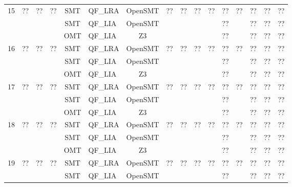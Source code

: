 \begin{landscape}
\begin{longtable}{|c|c|c|c|c|l|c|c|c|c|c|c|c|c|c|c|}
            \hline
            \multirow{3}{*}{15} & \multirow{3}{*}{??} & \multirow{3}{*}{??} & \multirow{3}{*}{??} & SMT & QF\_LRA & OpenSMT & \multirow{3}{*}{??} & \multirow{3}{*}{??} & \multirow{3}{*}{??} & \multirow{3}{*}{??} & ?? & \multirow{3}{*}{??} & ?? & ?? & ?? \\
            & & & & SMT & QF\_LIA & OpenSMT & & & & & ?? & & ?? & ?? & ?? \\
            & & & & OMT & QF\_LIA & Z3 & & & & & ?? & & ?? & ?? & ?? \\
            \hline
            \multirow{3}{*}{16} & \multirow{3}{*}{??} & \multirow{3}{*}{??} & \multirow{3}{*}{??} & SMT & QF\_LRA & OpenSMT & \multirow{3}{*}{??} & \multirow{3}{*}{??} & \multirow{3}{*}{??} & \multirow{3}{*}{??} & ?? & \multirow{3}{*}{??} & ?? & ?? & ?? \\
            & & & & SMT & QF\_LIA & OpenSMT & & & & & ?? & & ?? & ?? & ?? \\
            & & & & OMT & QF\_LIA & Z3 & & & & & ?? & & ?? & ?? & ?? \\
            \hline
            \multirow{3}{*}{17} & \multirow{3}{*}{??} & \multirow{3}{*}{??} & \multirow{3}{*}{??} & SMT & QF\_LRA & OpenSMT & \multirow{3}{*}{??} & \multirow{3}{*}{??} & \multirow{3}{*}{??} & \multirow{3}{*}{??} & ?? & \multirow{3}{*}{??} & ?? & ?? & ?? \\
            & & & & SMT & QF\_LIA & OpenSMT & & & & & ?? & & ?? & ?? & ?? \\
            & & & & OMT & QF\_LIA & Z3 & & & & & ?? & & ?? & ?? & ?? \\
            \hline
            \multirow{3}{*}{18} & \multirow{3}{*}{??} & \multirow{3}{*}{??} & \multirow{3}{*}{??} & SMT & QF\_LRA & OpenSMT & \multirow{3}{*}{??} & \multirow{3}{*}{??} & \multirow{3}{*}{??} & \multirow{3}{*}{??} & ?? & \multirow{3}{*}{??} & ?? & ?? & ?? \\
            & & & & SMT & QF\_LIA & OpenSMT & & & & & ?? & & ?? & ?? & ?? \\
            & & & & OMT & QF\_LIA & Z3 & & & & & ?? & & ?? & ?? & ?? \\
            \hline
            \multirow{3}{*}{19} & \multirow{3}{*}{??} & \multirow{3}{*}{??} & \multirow{3}{*}{??} & SMT & QF\_LRA & OpenSMT & \multirow{3}{*}{??} & \multirow{3}{*}{??} & \multirow{3}{*}{??} & \multirow{3}{*}{??} & ?? & \multirow{3}{*}{??} & ?? & ?? & ?? \\
            & & & & SMT & QF\_LIA & OpenSMT & & & & & ?? & & ?? & ?? & ?? \\

\end{longtable}
\end{landscape}
